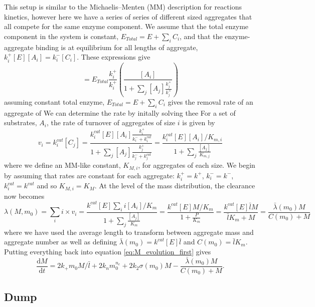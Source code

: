 This setup is similar to the Michaelis–Menten (MM) description for reactions kinetics, however here we have a series of series of different sized aggregates that all compete for the same enzyme component. We assume that the total enzyme component in the system is constant, $E_{Total} = E + \sum_i C_i$, and that the enzyme-aggregate binding is at equilibrium for all lengths of aggregate, $k_i^+ [E] [A_i] = k_i^- [C_i]$. These expressions give
\begin{equation}
    [C_i] = E_{Total}\frac{k_i^+}{k_i^+}\left(\frac{[A_i]}{1+\sum_j[A_j]\frac{k_j^+}{k_j^+}}\right)
\end{equation}
assuming constant total enzyme, $E_{Total} = E + \sum_i C_i$ gives the removal rate of an aggregate of  We can determine the rate by initally solving thee 
For a set of substrates, $A_i$, the rate of turnover of aggregates of size $i$ is given by
\begin{equation}
    v_i = k_i^{cat}[C_j] = \frac{k_i^{cat}[E][A_i]\frac{k_i^+}{k_i^- + k^{cat}_i}}{1+\sum_j[A_j]\frac{k_j^+}{k_j^- + k^{cat}_j}} = \frac{k_i^{cat}[E][A_i]/K_{m,i}}{1+\sum_j\frac{[A_j]}{K_{m,j}}}
\end{equation}
where we define an MM-like constant, $K_{M, i}$, for aggregates of each size. We begin by assuming that rates are constant for each aggregate: $k_i^+=k^+$, $k_i^-=k^-$, $k_i^{cat}=k^{cat}$ and so $K_{M, i} = K_{M}$. At the level of the mass distribution, the clearance now becomes
\begin{equation}
    \lambda(M, m_0) = \sum_i i\times v_i = \frac{k^{cat}[E]\sum_i i [A_i]/K_{m}}{1+\sum_j\frac{[A_j]}{K_{m}}} = \frac{k^{cat}[E]M/K_{m}}{1+\frac{P}{K_{m}}} = \frac{k^{cat}[E]\bar{l}M}{\bar{l}K_{m} + M} = \frac{\bar{\lambda}(m_0)M}{C(m_0) + M}
\end{equation}
where we have used the average length to transform between aggregate mass and aggregate number as well as defining $\bar{\lambda}(m_0) = k^{cat}[E]\bar{l}$ and $C(m_0)=\bar{l}K_{m}$. Putting everything back into equation \eqref{eq:M_evolution_first} gives
\begin{equation}
    \frac{\text{d}M}{\text{d}t} = 2 k_+m_0 M/\bar{l}+2k_n m_0^{n_c}+2k_2\sigma(m_0)M-\frac{\bar{\lambda}(m_0)M}{C(m_0) + M}.
\label{eq:M_evolution}
\end{equation}

\subsection{Dump}

